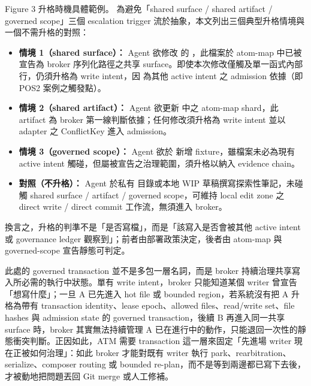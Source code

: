 \documentclass[a4paper,fontset=none]{ctexart}
\begin{document}
Figure 3 升格時機具體範例。 為避免「shared surface / shared artifact / governed scope」三個 escalation trigger 流於抽象，本文列出三個典型升格情境與一個不需升格的對照：

\begin{itemize}
\item \textbf{情境 1（shared surface）：} Agent 欲修改 \texttt{} 的 \texttt{}，此檔案於 atom-map 中已被宣告為 broker 序列化路徑之共享 surface。即使本次修改僅觸及單一函式內部行，仍須升格為 write intent，因 \texttt{} 為其他 active intent 之 admission 依據（即 POS2 案例之觸發點）。
\item \textbf{情境 2（shared artifact）：} Agent 欲更新 \texttt{} 中之 atom-map shard，此 artifact 為 broker 第一線判斷依據；任何修改須升格為 write intent 並以 \texttt{} adapter 之 ConflictKey 進入 admission。
\item \textbf{情境 3（governed scope）：} Agent 欲於 \texttt{} 新增 fixture，雖檔案未必為現有 active intent 觸碰，但屬被宣告之治理範圍，須升格以納入 evidence chain。
\item \textbf{對照（不升格）：} Agent 於私有 \texttt{} 目錄或本地 WIP 草稿撰寫探索性筆記，未碰觸 shared surface / artifact / governed scope，可維持 local edit zone 之 direct write / direct commit 工作流，無須進入 broker。
\end{itemize}

換言之，升格的判準不是「是否寫檔」，而是「該寫入是否會被其他 active intent 或 governance ledger 觀察到」；前者由部署政策決定，後者由 atom-map 與 governed-scope 宣告靜態可判定。

此處的 governed transaction 並不是多包一層名詞，而是 broker 持續治理共享寫入所必需的執行中狀態。單有 write intent，broker 只能知道某個 writer 曾宣告「想寫什麼」；一旦 A 已先進入 hot file 或 bounded region，若系統沒有把 A 升格為帶有 transaction identity、lease epoch、allowed files、read/write set、file hashes 與 admission state 的 governed transaction，後續 B 再進入同一共享 surface 時，broker 其實無法持續管理 A 已在進行中的動作，只能退回一次性的靜態衝突判斷。正因如此，ATM 需要 transaction 這一層來固定「先進場 writer 現在正被如何治理」：如此 broker 才能對既有 writer 執行 park、rearbitration、serialize、composer routing 或 bounded re-plan，而不是等到兩邊都已寫下去後，才被動地把問題丟回 Git merge 或人工修補。
\end{document}

